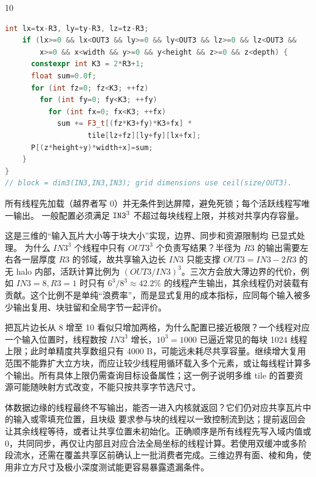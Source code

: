 \begin{solutionexercise}{10}
\begin{lstlisting}[language=C++]
    int lx=tx-R3, ly=ty-R3, lz=tz-R3;
    if (lx>=0 && lx<OUT3 && ly>=0 && ly<OUT3 && lz>=0 && lz<OUT3 &&
        x>=0 && x<width && y>=0 && y<height && z>=0 && z<depth) {
      constexpr int K3 = 2*R3+1;
      float sum=0.0f;
      for (int fz=0; fz<K3; ++fz)
        for (int fy=0; fy<K3; ++fy)
          for (int fx=0; fx<K3; ++fx)
            sum += F3_t[(fz*K3+fy)*K3+fx] *
                   tile[lz+fz][ly+fy][lx+fx];
      P[(z*height+y)*width+x]=sum;
    }
}
// block = dim3(IN3,IN3,IN3); grid dimensions use ceil(size/OUT3).
\end{lstlisting}
所有线程先加载（越界者写 0）并无条件到达屏障，避免死锁；每个活跃线程写唯一输出。
一般配置必须满足 $\code{IN3}^3$ 不超过每块线程上限，并核对共享内存容量。

\conclusionheading 这是三维的“输入瓦片大小等于块大小”实现，边界、同步和资源限制均
已显式处理。
\discussionheading
{}
为什么 $IN3^3$ 个线程中只有 $OUT3^3$ 个负责写结果？半径为 $R3$ 的输出需要左右各一层厚度 $R3$ 的邻域，故共享输入边长 $IN3$ 只能支撑 $OUT3=IN3-2R3$ 的无 halo 内部，活跃计算比例为 $(OUT3/IN3)^3$。三次方会放大薄边界的代价，例如 $IN3=8,R3=1$ 时只有 $6^3/8^3\approx42.2\%$ 的线程产生输出，其余线程仍对装载有贡献。这个比例不是单纯“浪费率”，而是显式复用的成本指标，应同每个输入被多少输出复用、块驻留和全局字节一起评价。

把瓦片边长从 8 增至 10 看似只增加两格，为什么配置已接近极限？一个线程对应一个输入位置时，线程数按 $IN3^3$ 增长，$10^3=1000$ 已逼近常见的每块 1024 线程上限；此时单精度共享数组只有 4000 B，可能远未耗尽共享容量。继续增大复用范围不能靠扩大立方块，而应让较少线程用循环载入多个元素，或让每线程计算多个输出。所有具体上限仍需查询目标设备属性；这一例子说明多维 tile 的首要资源可能随映射方式改变，不能只按共享字节选尺寸。

体数据边缘的线程最终不写输出，能否一进入内核就返回？它们仍对应共享瓦片中的输入或零填充位置，且块级  要求参与块的线程以一致控制流到达；提前返回会让其余线程等待，或者让共享位置未初始化。正确顺序是所有线程先写入域内值或 0，共同同步，再仅让内部且对应合法全局坐标的线程计算。若使用双缓冲或多阶段流水，还需在覆盖共享区前确认上一批消费者完成。三维边界有面、棱和角，使用非立方尺寸及极小深度测试能更容易暴露遗漏条件。


\end{solutionexercise}

